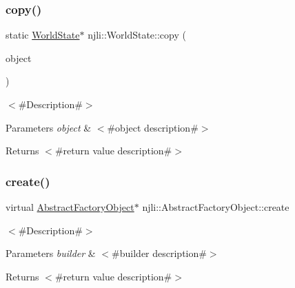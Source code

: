 \subsubsection{\texorpdfstring{copy()}{copy()}}
{\footnotesize\ttfamily static \mbox{\hyperlink{classnjli_1_1_world_state}{World\+State}}$\ast$ njli\+::\+World\+State\+::copy (\begin{DoxyParamCaption}\item[{const \mbox{\hyperlink{classnjli_1_1_world_state}{World\+State}} \&}]{object }\end{DoxyParamCaption})\hspace{0.3cm}{\ttfamily [static]}}

$<$\#\+Description\#$>$


\begin{DoxyParams}{Parameters}
{\em object} & $<$\#object description\#$>$\\
\hline
\end{DoxyParams}
\begin{DoxyReturn}{Returns}
$<$\#return value description\#$>$ 
\end{DoxyReturn}
\mbox{\label{classnjli_1_1_world_state_a83a8876ae63b92804004cf3febe76573}} 
\subsubsection{\texorpdfstring{create()}{create()}\hspace{0.1cm}{\footnotesize\ttfamily [1/3]}}
{\footnotesize\ttfamily virtual \mbox{\hyperlink{classnjli_1_1_abstract_factory_object}{Abstract\+Factory\+Object}}$\ast$ njli\+::\+Abstract\+Factory\+Object\+::create}

$<$\#\+Description\#$>$


\begin{DoxyParams}{Parameters}
{\em builder} & $<$\#builder description\#$>$\\
\hline
\end{DoxyParams}
\begin{DoxyReturn}{Returns}
$<$\#return value description\#$>$ 
\end{DoxyReturn}
\mbox{\label{classnjli_1_1_world_state_a4314a91c41dcb4b3418cc6e077c9b191}} 
